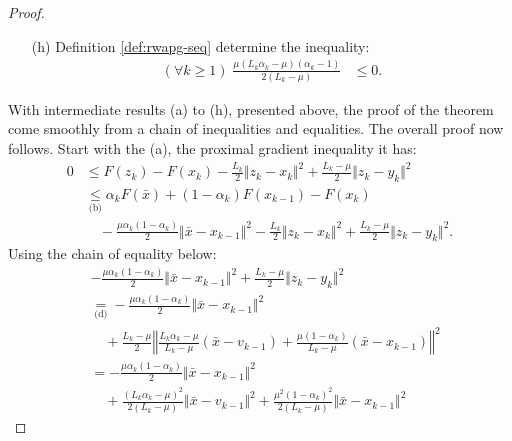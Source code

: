 \documentclass[12pt]{article}
\begin{document}
\begin{proof}
\begin{itemize}
                \item [(h)] Definition \ref{def:rwapg-seq} determine the inequality: 
                \begin{align*}
                    (\forall k \ge 1)\; \frac{\mu(L_k\alpha_k - \mu)(\alpha_k - 1)}{2(L_k - \mu)} &\le 0.   
                \end{align*}
            \end{itemize}
            With intermediate results (a) to (h), presented above, the proof of the theorem come smoothly from a chain of inequalities and equalities. 
            The overall proof now follows. 
            Start with the (a), the proximal gradient inequality it has: 
            \begin{align*}
                0 &\le F(z_k) - F(x_k) - \frac{L_k}{2}\Vert z_k - x_k\Vert^2 + \frac{L_k - \mu}{2}\Vert z_k - y_k\Vert^2
                \\
                &\underset{\text{(b)}}{\le}
                \alpha_k F(\bar x) + (1 - \alpha_k)F(x_{k - 1}) - F(x_k) \\
                    &\quad 
                    - \frac{\mu\alpha_k(1 - \alpha_k)}{2}\Vert \bar x - x_{k - 1}\Vert^2
                    - \frac{L_k}{2}\Vert z_k - x_k\Vert^2 + \frac{L_k - \mu}{2}\Vert z_k - y_k\Vert^2. 
            \end{align*}
            Using the chain of equality below: 
            {\footnotesize
            \begin{align*}
                &- \frac{\mu\alpha_k(1 - \alpha_k)}{2}\Vert \bar x - x_{k - 1}\Vert^2
                + \frac{L_k - \mu}{2}\Vert z_k - y_k\Vert^2
                \\
                &\underset{\text{(d)}}{=} 
                -\frac{\mu\alpha_k(1 - \alpha_k)}{2}\Vert \bar x - x_{k - 1}\Vert^2\\ 
                    &\quad +
                    \frac{L_k - \mu}{2}
                    \left\Vert 
                        \frac{L_k\alpha_k - \mu}{L_k - \mu}(\bar x - v_{k - 1}) + 
                        \frac{\mu(1 - \alpha_k)}{L_k - \mu}(\bar x - x_{k - 1})
                    \right\Vert^2
                \\
                &= 
                - \frac{\mu\alpha_k(1 - \alpha_k)}{2}\Vert \bar x - x_{k - 1}\Vert^2\\&\quad 
                    + \frac{(L_k\alpha_k - \mu)^2}{2(L_k - \mu)} \Vert \bar x - v_{k - 1}\Vert^2
                    + \frac{\mu^2(1 - \alpha_k)^2}{2(L_k - \mu)} \Vert \bar x - x_{k - 1}\Vert^2

\end{align*}}
\end{proof}
\end{document}
